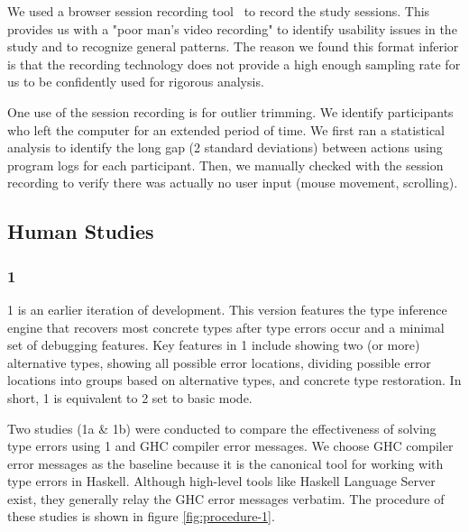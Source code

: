 We used a browser session recording tool~\cite{openreplay_openreplay_2022} to record the study sessions. This provides us with a "poor man's video recording" to identify usability issues in the study and to recognize general patterns. The reason we found this format inferior is that the recording technology does not provide a high enough sampling rate for us to be confidently used for rigorous analysis.

One use of the session recording is for outlier trimming.  We identify participants who left the computer for an extended period of time. We first ran a statistical analysis to identify the long gap (2 standard deviations) between actions using program logs for each participant. Then, we manually checked with the session recording to verify there was actually no user input (mouse movement, scrolling). 

\subsection{\chameleon{} Human Studies}

\subsubsection{\textbf{\chameleon{} 1}}  
\chameleon{} 1 is an earlier iteration of \chameleon{} development. This version features the type inference engine that recovers most concrete types after type errors occur and a minimal set of debugging features. Key features in \chameleon{} 1 include showing two (or more) alternative types, showing all possible error locations, dividing possible error locations into groups based on alternative types, and concrete type restoration. In short, \chameleon{} 1 is equivalent to \chameleon{} 2 set to basic mode. 


Two  studies (1a \& 1b) were conducted to compare the effectiveness of solving type errors using \chameleon{} 1 and GHC compiler error messages. We choose GHC compiler error messages as the baseline because it is the canonical tool for working with type errors in Haskell. Although high-level tools like Haskell Language Server exist, they generally relay the GHC error messages verbatim. The procedure of these studies is shown in figure \ref{fig:procedure-1}.


